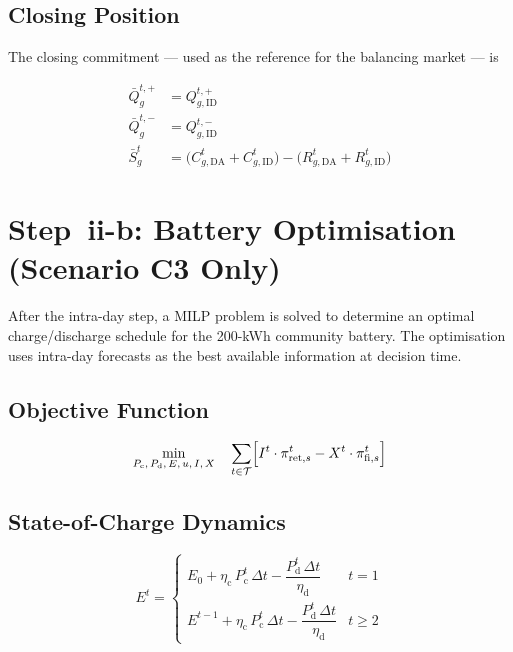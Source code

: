 \documentclass[12pt,a4paper]{article}
\begin{document}
\subsection{Closing Position}

The closing commitment — used as the reference for the balancing market — is

\begin{align}
\bar{Q}_{g}^{t,+} &= Q_{g,\mathrm{ID}}^{t,+} \label{eq:closing_buy}\\
\bar{Q}_{g}^{t,-} &= Q_{g,\mathrm{ID}}^{t,-} \label{eq:closing_sell}\\
\bar{S}_{g}^{t}   &= \bigl(C_{g,\mathrm{DA}}^{t} + C_{g,\mathrm{ID}}^{t}\bigr)
         - \bigl(R_{g,\mathrm{DA}}^{t} + R_{g,\mathrm{ID}}^{t}\bigr)
  \label{eq:closing_cost}
\end{align}

\section{Step~ii-b: Battery Optimisation (Scenario C3 Only)}

After the intra-day step, a MILP problem is solved to determine an optimal
charge/discharge schedule for the 200-kWh community battery.  The optimisation
uses intra-day forecasts as the best available information at decision time.

\subsection{Objective Function}

\begin{equation}
\min_{P_{\mathrm{c}},\,P_{\mathrm{d}},\,E,\,u,\,I,\,X}
\quad
\sum_{t \in \mathcal{T}}\Bigl[
  I^{t} \cdot \pi_{\mathrm{ret},s}^{t}
  - X^{t} \cdot \pi_{\mathrm{fi},s}^{t}
\Bigr]
\label{eq:battery_obj}
\end{equation}

\subsection{State-of-Charge Dynamics}

\begin{equation}
E^{t} =
\begin{cases}
  E_{0} + \eta_{\mathrm{c}}\,P_{\mathrm{c}}^{t}\,\Delta t
       - \dfrac{P_{\mathrm{d}}^{t}\,\Delta t}{\eta_{\mathrm{d}}}
  & t = 1\\[8pt]
  E^{t-1} + \eta_{\mathrm{c}}\,P_{\mathrm{c}}^{t}\,\Delta t
           - \dfrac{P_{\mathrm{d}}^{t}\,\Delta t}{\eta_{\mathrm{d}}}
  & t \geq 2
\end{cases}
\label{eq:soc_dynamics}
\end{equation}
\end{document}
